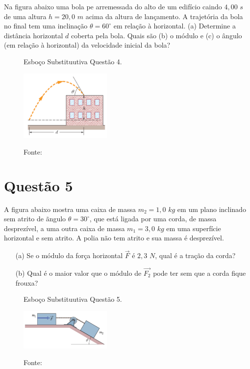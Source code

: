 \textbf{\cite{Halliday2009}} Na figura abaixo uma bola pe arremessada do alto de um edifício caindo $4,00$ $s$ de uma altura $h = 20,0$ $m$ acima da altura de lançamento. A trajetória da bola no final tem uma inclinação $\theta = 60^{\circ}$ em relação à horizontal. (a) Determine a distância horizontal $d$ coberta pela bola. Quais são (b) o módulo e (c) o ângulo (em relação à horizontal) da velocidade inicial da bola?
\begin{figure}[ht]
\begin{center}
\caption*{Esboço Substituutiva Questão 4.}
\includegraphics[width=0.4\textwidth]{fig/orp1subs5.png}
\label{fig:ORP1s4}
\caption*{Fonte: }
\end{center}
\end{figure}

\section*{Questão 5}

\textbf{\cite{Halliday2009}} A figura abaixo mostra uma caixa de massa $m_2 = 1,0$ $kg$ em um plano inclinado sem atrito de ãngulo $\theta = 30^{\circ}$, que está ligada por uma corda, de massa desprezível, a uma outra caixa de massa $m_1 = 3,0$ $kg$ em uma superfície horizontal e sem atrito. A polia não tem atrito e sua massa é desprezível.
\begin{itemize}
    \item[(a)] Se o módulo da força horizontal $\vec{F}$ é $2,3$ $N$, qual é a tração da corda?
    \item[(b)] Qual é o maior valor que o módulo de $\vec{F_2}$ pode ter sem que a corda fique frouxa?
\end{itemize}

\begin{figure}[ht]
\begin{center}
\caption*{Esboço Substituutiva Questão 5.}
\includegraphics[width=0.4\textwidth]{fig/orp1s5real.png}
\label{fig:ORP1s5}
\caption*{Fonte: }
\end{center}
\end{figure}

